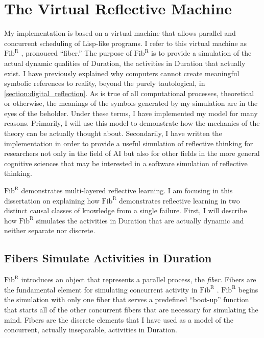 \chapter{The Virtual Reflective Machine}
\label{chapter:the_virtual_reflective_machine}

\newcommand{\FibR}{$\text{Fib}^\text{R}$ }

My implementation is based on a virtual machine that allows parallel
and concurrent scheduling of Lisp-like programs.  I refer to this
virtual machine as \FibR, pronouced ``fiber.''  The purpose of \FibR
is to provide a simulation of the actual dynamic qualities of
Duration, the activities in Duration that actually exist.  I have
previously explained why computers cannot create meaningful symbolic
references to reality, beyond the purely tautological, in
\autoref{section:digital_reflection}.  As is true of all computational
processes, theoretical or otherwise, the meanings of the symbols
generated by my simulation are in the eyes of the beholder.  Under
these terms, I have implemented my model for many reasons.  Primarily,
I will use this model to demonstrate how the mechanics of the theory
can be actually thought about.  Secondarily, I have written the
implementation in order to provide a useful simulation of reflective
thinking for researchers not only in the field of AI but also for
other fields in the more general cognitive sciences that may be
interested in a software simulation of reflective thinking.

\FibR demonstrates multi-layered reflective learning.  I am focusing
in this dissertation on explaining how \FibR demonstrates reflective
learning in two distinct causal classes of knowledge from a single
failure.  First, I will describe how \FibR simulates the activities in
Duration that are actually dynamic and neither separate nor discrete.

\section{Fibers Simulate Activities in Duration}

\FibR introduces an object that represents a parallel process, the
\emph{fiber}.  Fibers are the fundamental element for simulating
concurrent activity in \FibR.  \FibR begins the simulation with only
one fiber that serves a predefined ``boot-up'' function that starts
all of the other concurrent fibers that are necessary for simulating
the mind.  Fibers are the discrete elements that I have used as a
model of the concurrent, actually inseparable, activities in Duration.

